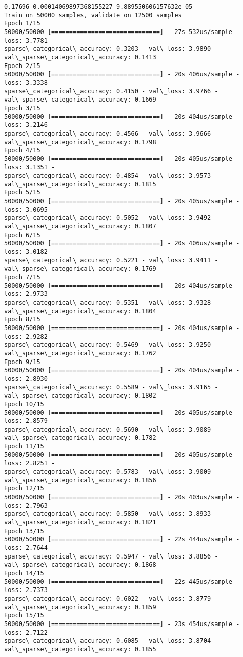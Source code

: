 \documentclass[11pt]{article}
\begin{document}
    \begin{Verbatim}[commandchars=\\\{\}]
0.17696 0.00014069897368155227 9.889550606157632e-05
Train on 50000 samples, validate on 12500 samples
Epoch 1/15
50000/50000 [==============================] - 27s 532us/sample - loss: 3.7781 -
sparse\_categorical\_accuracy: 0.3203 - val\_loss: 3.9890 -
val\_sparse\_categorical\_accuracy: 0.1413
Epoch 2/15
50000/50000 [==============================] - 20s 406us/sample - loss: 3.3338 -
sparse\_categorical\_accuracy: 0.4150 - val\_loss: 3.9766 -
val\_sparse\_categorical\_accuracy: 0.1669
Epoch 3/15
50000/50000 [==============================] - 20s 404us/sample - loss: 3.2146 -
sparse\_categorical\_accuracy: 0.4566 - val\_loss: 3.9666 -
val\_sparse\_categorical\_accuracy: 0.1798
Epoch 4/15
50000/50000 [==============================] - 20s 405us/sample - loss: 3.1351 -
sparse\_categorical\_accuracy: 0.4854 - val\_loss: 3.9573 -
val\_sparse\_categorical\_accuracy: 0.1815
Epoch 5/15
50000/50000 [==============================] - 20s 405us/sample - loss: 3.0695 -
sparse\_categorical\_accuracy: 0.5052 - val\_loss: 3.9492 -
val\_sparse\_categorical\_accuracy: 0.1807
Epoch 6/15
50000/50000 [==============================] - 20s 406us/sample - loss: 3.0182 -
sparse\_categorical\_accuracy: 0.5221 - val\_loss: 3.9411 -
val\_sparse\_categorical\_accuracy: 0.1769
Epoch 7/15
50000/50000 [==============================] - 20s 404us/sample - loss: 2.9733 -
sparse\_categorical\_accuracy: 0.5351 - val\_loss: 3.9328 -
val\_sparse\_categorical\_accuracy: 0.1804
Epoch 8/15
50000/50000 [==============================] - 20s 404us/sample - loss: 2.9282 -
sparse\_categorical\_accuracy: 0.5469 - val\_loss: 3.9250 -
val\_sparse\_categorical\_accuracy: 0.1762
Epoch 9/15
50000/50000 [==============================] - 20s 404us/sample - loss: 2.8930 -
sparse\_categorical\_accuracy: 0.5589 - val\_loss: 3.9165 -
val\_sparse\_categorical\_accuracy: 0.1802
Epoch 10/15
50000/50000 [==============================] - 20s 405us/sample - loss: 2.8579 -
sparse\_categorical\_accuracy: 0.5690 - val\_loss: 3.9089 -
val\_sparse\_categorical\_accuracy: 0.1782
Epoch 11/15
50000/50000 [==============================] - 20s 405us/sample - loss: 2.8251 -
sparse\_categorical\_accuracy: 0.5783 - val\_loss: 3.9009 -
val\_sparse\_categorical\_accuracy: 0.1856
Epoch 12/15
50000/50000 [==============================] - 20s 403us/sample - loss: 2.7963 -
sparse\_categorical\_accuracy: 0.5850 - val\_loss: 3.8933 -
val\_sparse\_categorical\_accuracy: 0.1821
Epoch 13/15
50000/50000 [==============================] - 22s 444us/sample - loss: 2.7644 -
sparse\_categorical\_accuracy: 0.5947 - val\_loss: 3.8856 -
val\_sparse\_categorical\_accuracy: 0.1868
Epoch 14/15
50000/50000 [==============================] - 22s 445us/sample - loss: 2.7373 -
sparse\_categorical\_accuracy: 0.6022 - val\_loss: 3.8779 -
val\_sparse\_categorical\_accuracy: 0.1859
Epoch 15/15
50000/50000 [==============================] - 23s 454us/sample - loss: 2.7122 -
sparse\_categorical\_accuracy: 0.6085 - val\_loss: 3.8704 -
val\_sparse\_categorical\_accuracy: 0.1855
    \end{Verbatim}
\end{document}
